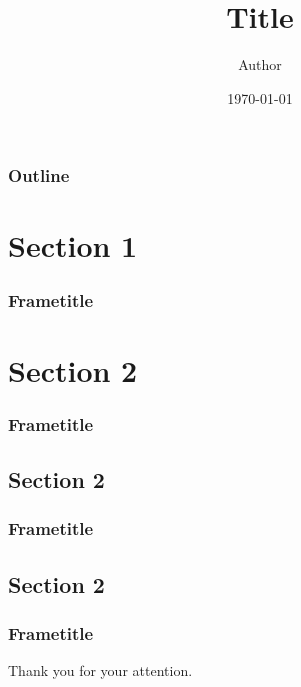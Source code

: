 \documentclass[utf8]{beamer}
\title{Title}
\author{Author}
\date{\today}
\begin{document}
\maketitle

\begin{frame}
    \frametitle{Outline}
    \tableofcontents
\end{frame}

\section{Section 1}

\begin{frame}
    \frametitle{Frametitle}
    \blinditemize
\end{frame}


\section{Section 2}

\begin{frame}
    \frametitle{Frametitle}
    \blinditemize
\end{frame}


\subsection{Section 2}

\begin{frame}
    \frametitle{Frametitle}
    \blinditemize
\end{frame}


\subsection{Section 2}

\begin{frame}
    \frametitle{Frametitle}
    \blinditemize
\end{frame}

\begin{frame}
    \begin{center}
        \Huge Thank you for your attention.
    \end{center}
\end{frame}
\end{document}
